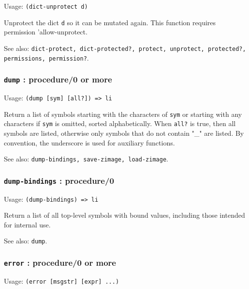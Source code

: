 \documentclass[
]{article}
\newcommand{\passthrough}[1]{#1}
\begin{document}
Usage: \passthrough{\lstinline!(dict-unprotect d)!}

Unprotect the dict \passthrough{\lstinline!d!} so it can be mutated
again. This function requires permission 'allow-unprotect.

See also:
\passthrough{\lstinline!dict-protect, dict-protected?, protect, unprotect, protected?, permissions, permission?!}.

\hypertarget{dump-procedure0-or-more}{%
\subsubsection{\texorpdfstring{\texttt{dump} : procedure/0 or
more}{dump : procedure/0 or more}}\label{dump-procedure0-or-more}}

Usage: \passthrough{\lstinline!(dump [sym] [all?]) => li!}

Return a list of symbols starting with the characters of
\passthrough{\lstinline!sym!} or starting with any characters if
\passthrough{\lstinline!sym!} is omitted, sorted alphabetically. When
\passthrough{\lstinline!all?!} is true, then all symbols are listed,
otherwise only symbols that do not contain "\_" are listed. By
convention, the underscore is used for auxiliary functions.

See also:
\passthrough{\lstinline!dump-bindings, save-zimage, load-zimage!}.

\hypertarget{dump-bindings-procedure0}{%
\subsubsection{\texorpdfstring{\texttt{dump-bindings} :
procedure/0}{dump-bindings : procedure/0}}\label{dump-bindings-procedure0}}

Usage: \passthrough{\lstinline!(dump-bindings) => li!}

Return a list of all top-level symbols with bound values, including
those intended for internal use.

See also: \passthrough{\lstinline!dump!}.

\hypertarget{error-procedure0-or-more}{%
\subsubsection{\texorpdfstring{\texttt{error} : procedure/0 or
more}{error : procedure/0 or more}}\label{error-procedure0-or-more}}

Usage: \passthrough{\lstinline!(error [msgstr] [expr] ...)!}
\end{document}
